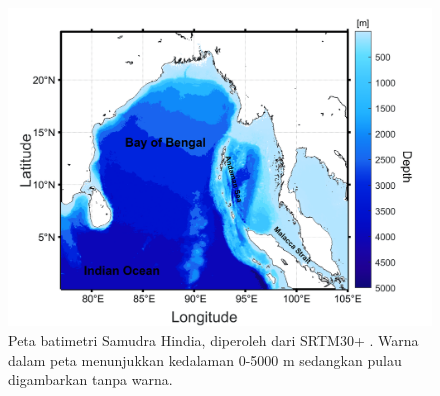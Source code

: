 \begin{spacing}{1.5}
	\begin{figure}[H]
		\centering
		\includegraphics[width=12cm]{contents/Figures/Batimetri_edit_compress}
		\caption{Peta batimetri Samudra Hindia, diperoleh dari SRTM30+ \protect\cite{becker2009global}. Warna dalam peta menunjukkan kedalaman 0-5000 m sedangkan pulau digambarkan tanpa warna.}
		\label{fig:domain}
	\end{figure}
\end{spacing}
\vspace{-0.5pc}
